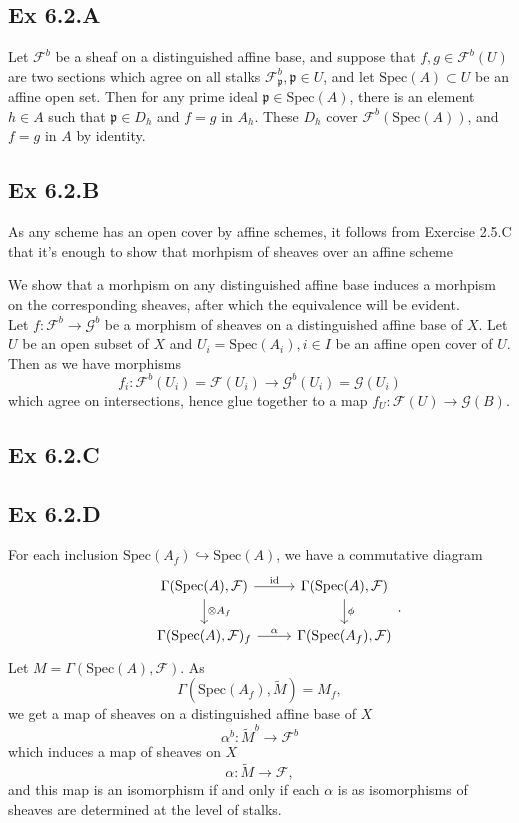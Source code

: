 \documentclass{article}
\theoremstyle{definition}
\newcommand{\Spec}{\text{Spec}}
\begin{document}
\subsection*{Ex 6.2.A}

Let $\mathcal{F}^{b}$ be a sheaf on a distinguished affine base, and suppose
that $f, g \in \mathcal{F}^{b}(U)$ are two sections which agree on all stalks
$\mathcal{F}^{b}_{\mathfrak{p}}, \mathfrak{p} \in U$, and let $\Spec(A) \subset
	U$ be an affine open set. Then for any prime ideal $\mathfrak{p} \in \Spec(A)$,
there is an element $h \in A$ such that $\mathfrak{p} \in D_h$ and $f = g$ in
$A_{h}$. These $D_h$ cover $\mathcal{F}^{b}(\Spec(A))$, and $f = g$ in $A$ by
identity.


\subsection*{Ex 6.2.B}

As any scheme has an open cover by affine schemes, it follows from Exercise 2.5.C
that it's enough to show that morhpism of sheaves over an affine scheme

We show that a morhpism on any distinguished affine base induces a morhpism on
the corresponding sheaves, after which the equivalence will be evident. \\

Let $f : \mathcal{F}^{b} \to \mathcal{G}^{b}$ be a morphism of sheaves on a
distinguished affine base of $X$. Let $U$ be an open subset of $X$ and $U_i =
	\Spec(A_i), i \in I$ be an affine open cover of $U$. Then as we have morphisms
\[
	f_i
	:
	\mathcal{F}^{b}(U_i) = \mathcal{F}(U_i)
	\to
	\mathcal{G}^{b}(U_i) = \mathcal{G}(U_i)
\]
which agree on intersections, hence glue together to a map $f_U :
	\mathcal{F}(U) \to \mathcal{G}(B)$.

\subsection*{Ex 6.2.C}

\subsection*{Ex 6.2.D}

For each inclusion $\Spec(A_f) \hookrightarrow \Spec(A)$, we have a
commutative diagram
\[
	\begin{tikzcd}
		&
		\Gamma(\Spec(A), \mathcal{F})
		\ar[r, "\mathrm{id}"]
		\ar[d, "\otimes A_f"]
		&
		\Gamma(\Spec(A), \mathcal{F})
		\ar[d, "\phi"] \\
		&
		\Gamma(\Spec(A), \mathcal{F})_f
		\ar[r, "\alpha"]
		&
		\Gamma(\Spec(A_f), \mathcal{F})
	\end{tikzcd}.
\]
Let $M = \Gamma(\Spec(A), \mathcal{F})$.
As
\[
	\Gamma(\Spec(A_f), \widetilde{M})
	=
	M_f,
\]
we get a map of sheaves on a distinguished affine base of $X$
\[
	\alpha^{b}
	:
	\widetilde{M}^{b}
	\to
	\mathcal{F}^{b}
\]
which induces a map of sheaves on $X$
\[
	\alpha
	:
	\widetilde{M}
	\to
	\mathcal{F},
\]
and this map is an isomorphism if and only if each $\alpha$ is as isomorphisms
of sheaves are determined at the level of stalks.
\end{document}

